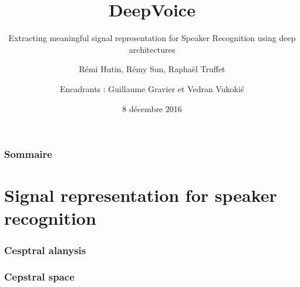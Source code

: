 \documentclass[11pt,english]{beamer}
\title{DeepVoice}
\subtitle{Extracting meaningful signal representation for Speaker Recognition
  using deep architectures}
\author{Rémi Hutin, Rémy Sun, Raphaël Truffet \and Encadrants : Guillaume Gravier et Vedran Vukoki\'c}
\institute{ENS Rennes, IRISA}
\date{8 décembre 2016}
\begin{document}
\begin{frame}
    \titlepage
\end{frame}

\begin{frame}
    \frametitle{Sommaire}
    \tableofcontents[hideallsubsections]
\end{frame}






\section{Signal representation for speaker recognition}

\begin{frame}
  \frametitle{Cesptral alanysis}
  
\end{frame}


\begin{frame}
  \frametitle{Cepstral space}
  \begin{columns}
    
  \end{columns}
\end{frame}
\end{document}
